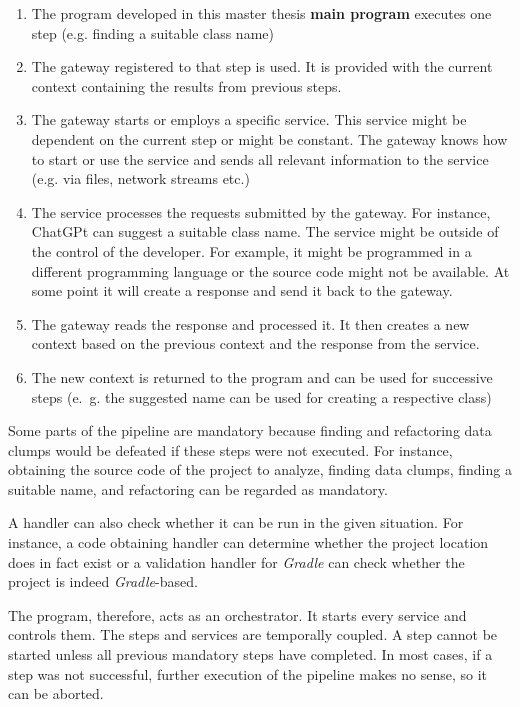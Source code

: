 \begin{enumerate}
    \item The program developed in this master thesis \textbf{main program} executes one step (e.g. finding a suitable class name)
    \item The gateway registered to that step is used. It is provided with the current context containing the results from previous steps.
    \item The gateway starts or employs a specific service. This service might be dependent on the current step or might be constant. The gateway knows how to start or use the service and sends all relevant information to the service (e.g. via files, network streams etc.) 
    \item The service processes the requests submitted by the gateway. For instance, ChatGPt can suggest a suitable class name. The service might be outside of the control of the developer. For example, it might be programmed in a different programming language or the source code might not be available. At some point it will create a response and send it back to the gateway. 
    \item The gateway reads the response and processed it. It then creates a new context based on the previous context and the response from the service. 
    \item The new context is returned to the program and can be used for successive steps (e.~g. the suggested name can be used for creating a respective class) 
\end{enumerate}



Some parts of the pipeline are mandatory because finding and refactoring data clumps would be defeated if these steps were not executed. For instance, obtaining the source code of the project to analyze, finding data clumps, finding a suitable name, and refactoring can be regarded as mandatory.



A handler can also check whether it can be run in the given situation. For instance, a code obtaining handler can determine whether the project location does in fact exist or a validation handler for \textit{Gradle} can check whether the project is indeed \textit{Gradle}-based.

The program, therefore, acts as an orchestrator. It starts every service and controls them. The steps and services are temporally coupled. A step cannot be started unless all previous mandatory steps have completed. In most cases, if a step was not successful, further execution of the pipeline makes no sense, so it can be aborted. 

